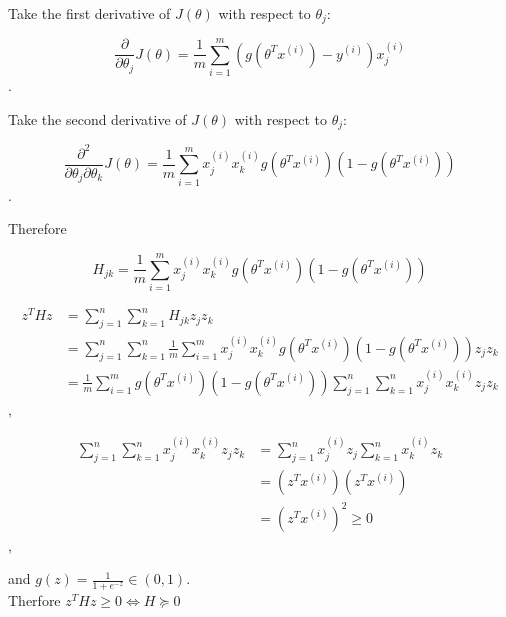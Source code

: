 \begin{answer}
	\\
    Take the first derivative of $J(\theta)$ with respect to $\theta_j$:
    
    $$
    \frac{\partial}{\partial \theta_j} J(\theta) = \frac{1}{m}\sum_{i = 1}^m (g(\theta^T x^{(i)}) - y^{(i)})x_j^{(i)}
    $$.
    
    Take the second derivative of $J(\theta)$ with respect to $\theta_j$:

    $$
    \frac{\partial^2}{\partial \theta_j \partial \theta_k} J(\theta) = \frac{1}{m}\sum_{i = 1}^m x_j^{(i)} x_k^{(i)} g(\theta^T x^{(i)}) (1 - g(\theta^T x^{(i)}))
    $$.
    
    Therefore
    
    $$
    H_{jk} = \frac{1}{m}\sum_{i = 1}^m x_j^{(i)} x_k^{(i)} g(\theta^T x^{(i)}) (1 - g(\theta^T x^{(i)}))
    $$
    
    \begin{align*}
    	z^T H z & = \sum_{j = 1}^n \sum_{k = 1}^n H_{jk} z_j z_k\\
    		& = \sum_{j = 1}^n \sum_{k = 1}^n \frac{1}{m}\sum_{i = 1}^m x_j^{(i)} x_k^{(i)} g(\theta^T x^{(i)}) (1 - g(\theta^T x^{(i)})) z_j z_k\\
    		& = \frac{1}{m}\sum_{i = 1}^m g(\theta^T x^{(i)}) (1 - g(\theta^T x^{(i)})) \sum_{j = 1}^n \sum_{k = 1}^n x_j^{(i)} x_k^{(i)} z_j z_k
    \end{align*},
    
    \begin{align*}
    	\sum_{j = 1}^n \sum_{k = 1}^n x_j^{(i)} x_k^{(i)} z_j z_k & = \sum_{j = 1}^n x_j^{(i)} z_j \sum_{k = 1}^n  x_k^{(i)} z_k\\
    		& = (z^T x^{(i)}) (z^T x^{(i)})\\
    		& = (z^T x^{(i)})^2 \ge 0
    \end{align*},
    
    and $g(z) = \frac{1}{1 + e^{-z}} \in (0, 1)$.\\
    Therfore $z^T H z \ge 0 \iff H\succeq 0$
\end{answer}
